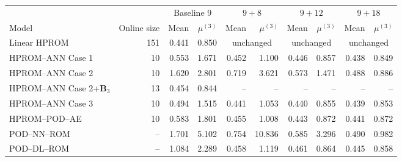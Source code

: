 \begin{tabular}{lr|rr|rr|rr|rr}
\toprule
\multicolumn{2}{c|}{} & \multicolumn{2}{c|}{Baseline 9} & \multicolumn{2}{c|}{$9+8$} & \multicolumn{2}{c|}{$9+12$} & \multicolumn{2}{c}{$9+18$} \\ Model & Online size & Mean & $\mu^{(3)}$ & Mean & $\mu^{(3)}$ & Mean & $\mu^{(3)}$ & Mean & $\mu^{(3)}$ \\
\midrule
Linear HPROM & 151 & 0.441 & 0.850 & \multicolumn{2}{c|}{unchanged} & \multicolumn{2}{c|}{unchanged} & \multicolumn{2}{c}{unchanged} \\
HPROM--ANN Case 1 & 10 & 0.553 & 1.671 & 0.452 & 1.100 & 0.446 & 0.857 & 0.438 & 0.849 \\
HPROM--ANN Case 2 & 10 & 1.620 & 2.801 & 0.719 & 3.621 & 0.573 & 1.471 & 0.488 & 0.886 \\
HPROM--ANN Case 2+$\mathbf B_3$ & 13 & 0.454 & 0.844 & -- & -- & -- & -- & -- & -- \\
HPROM--ANN Case 3 & 10 & 0.494 & 1.515 & 0.441 & 1.053 & 0.440 & 0.855 & 0.439 & 0.853 \\
HPROM--POD--AE & 10 & 0.583 & 1.801 & 0.455 & 1.008 & 0.443 & 0.872 & 0.441 & 0.872 \\
\midrule
POD--NN--ROM & -- & 1.701 & 5.102 & 0.754 & 10.836 & 0.585 & 3.296 & 0.490 & 0.982 \\
POD--DL--ROM & -- & 1.084 & 2.289 & 0.458 & 1.119 & 0.461 & 0.864 & 0.445 & 0.858 \\
\bottomrule
\end{tabular}
